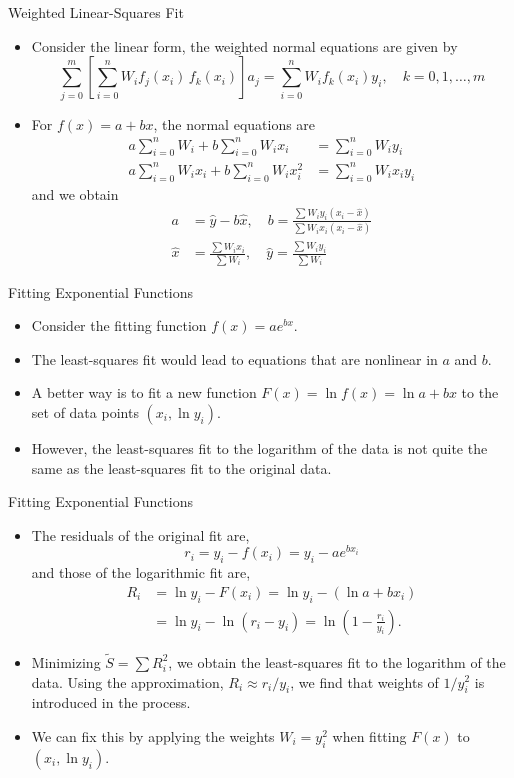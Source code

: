 \documentclass{beamer}
\newcommand{\beforeverb}{\footnotesize}
\newcommand{\afterverb}{\normalsize}
\begin{document}
\begin{frame}{Weighted Linear-Squares Fit}
\begin{itemize}
\item Consider the linear form, the weighted normal equations are given by
\beforeverb
\[
\sum_{j=0}^m \left[\sum_{i=0}^n W_i f_j(x_i)\, f_k(x_i)\right] a_j =\sum_{i=0}^n W_i f_k(x_i) y_i, \quad k=0,1,\ldots,m
\]
\afterverb
\item For $f(x)=a+bx$, the normal equations are
\beforeverb
\begin{align*}
a \sum_{i=0}^n W_i+ b \sum_{i=0}^n W_i x_i &= \sum_{i=0}^n  W_i y_i \\
a \sum_{i=0}^n W_i x_i+b\sum_{i=0}^n W_i x_i^2 &= \sum_{i=0}^n W_i x_i y_i
\end{align*}
\afterverb
and we obtain
\beforeverb
\begin{align*}
a&=\hat{y} - b \hat{x},\quad b=\frac{\sum W_i y_i (x_i-\hat{x})}{	\sum W_i x_i (x_i-\hat{x})}\\
\hat{x}&=\frac{\sum W_i x_i}{\sum W_i },\quad \hat{y}=\frac{\sum W_i y_i}{\sum W_i }
\end{align*}
\afterverb
\end{itemize}
\end{frame}
\begin{frame}{Fitting Exponential Functions}
\begin{itemize}
\item  Consider  the fitting function $f(x)=ae^{bx}$. 
\item The least-squares fit would lead to equations that are \alert{nonlinear} in $a$ and $b$.
\item A better way is to fit a new  function $F(x)=\ln f(x)=\ln a + b x$ to the set of data points $( x_i, \ln y_i) $.
\item However, the least-squares fit to the logarithm of the data is \alert{not quite the same} as the least-squares fit to the original data. 

\end{itemize}
\end{frame}
\begin{frame}{Fitting Exponential Functions}
\begin{itemize}
\item The residuals of the original fit are,
\[
r_i =y_i-f(x_i)=y_i - a e^{bx_i}
\]
and those of the logarithmic  fit are,
\begin{align*}
R_i &=\ln y_i-F(x_i)=\ln y_i-(\ln a + b x_i )\\
 &=\ln y_i - \ln(r_i-y_i)=\ln \left(1-\frac{r_i}{y_i}\right).
\end{align*}
\item Minimizing $\tilde{S}=\sum R_i^2$, we obtain the least-squares fit to the logarithm of the data. Using the approximation, $R_i\approx r_i/y_i$,  we find that weights of \alert{$1/y_i^2$} is introduced in the process.
\item We can fix this by applying the weights $W_i=y_i^2$ when fitting $F(x)$ to $(x_i,\ln y_i)$.
\end{itemize}
\end{frame}
\end{document}
